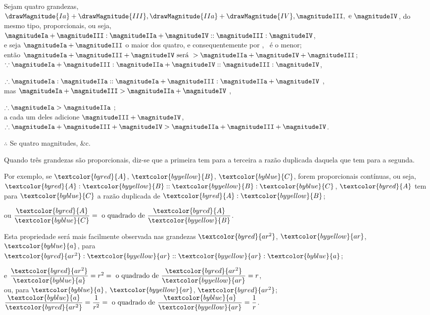 \documentclass[booklanguage=brazilian]{byrnebook}
\begin{document}
\begin{center}
Sejam quatro grandezas, $\drawMagnitude{Ia} + \drawMagnitude{III}, \drawMagnitude{IIa} + \drawMagnitude{IV}, \magnitudeIII, \mbox{ e } \magnitudeIV$, do mesmo tipo, proporcionais, ou seja,\\
$\magnitudeIa + \magnitudeIII : \magnitudeIIa + \magnitudeIV :: \magnitudeIII : \magnitudeIV$,\\
e seja $\magnitudeIa + \magnitudeIII$ o maior dos quatro, e consequentemente por , \magnitudeIV\ é o menor;\\
então $\magnitudeIa + \magnitudeIII + \magnitudeIV \mbox{ será } > \magnitudeIIa + \magnitudeIV + \magnitudeIII$;\\
$\because \magnitudeIa + \magnitudeIII : \magnitudeIIa + \magnitudeIV :: \magnitudeIII : \magnitudeIV$, %

$\therefore \magnitudeIa : \magnitudeIIa :: \magnitudeIa + \magnitudeIII : \magnitudeIIa + \magnitudeIV$ ,\\
mas $\magnitudeIa + \magnitudeIII > \magnitudeIIa + \magnitudeIV$ \byref{\hypref},

$\therefore \magnitudeIa > \magnitudeIIa$ ;\\
a cada um deles adicione $\magnitudeIII + \magnitudeIV$,\\
$\therefore \magnitudeIa + \magnitudeIII + \magnitudeIV > \magnitudeIIa + \magnitudeIII + \magnitudeIV$.

$\therefore$ Se quatro magnitudes, \&c.
\end{center}

\vfill\pagebreak

\label{def:V.X}
\def\varA{\textcolor{byred}{A}}
\def\varB{\textcolor{byyellow}{B}}
\def\varC{\textcolor{byblue}{C}}
\def\vararS{\textcolor{byred}{ar^2}}
\def\varar{\textcolor{byyellow}{ar}}
\def\vara{\textcolor{byblue}{a}}
Quando três grandezas são proporcionais, diz-se que a primeira tem para a terceira a razão duplicada daquela que tem para a segunda.

Por exemplo, se $\varA$, $\varB$, $\varC$, forem proporcionais contínuas, ou seja, $\varA : \varB :: \varB : \varC$, $\varA$ tem para $\varC$ a razão duplicada de $\varA : \varB$;

\begin{center}
ou $\dfrac{\varA}{\varC} = \mbox{ o quadrado de } \dfrac{\varA}{\varB}$.

Esta propriedade será mais facilmente observada nas grandezas $\vararS$, $\varar$, $\vara$, para $\vararS : \varar :: \varar : \vara$;

e $\dfrac{\vararS}{\vara} = r^2 = \mbox{ o quadrado de } \dfrac{\vararS}{\varar} = r$,\\
ou, para $\vara$, $\varar$, $\vararS$;\\
$\dfrac{\vara}{\vararS} = \dfrac{1}{r^2} = \mbox{ o quadrado de } \dfrac{\vara}{\varar} = \dfrac{1}{r}$.
\end{center}
\end{document}
